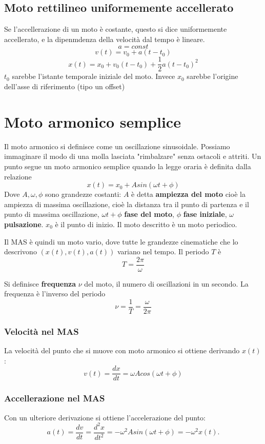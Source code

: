 \documentclass[a4paper]{report}
\begin{document}
  \subsection{Moto rettilineo uniformemente accellerato}
  Se l'accellerazione di un moto è costante, questo si dice uniformemente accellerato, e la dipenmdenza della velocità dal tempo è lineare.
  $$ a = const$$
  $$ v(t) = v_0 + a(t-t_0) $$
  $$ x(t) = x_0 + v_0(t-t_0) + \frac{1}{2} a(t-t_0)^2  $$
  $t_0$ sarebbe l'istante temporale iniziale del moto. Invece $x_0$ sarebbe l'origine dell'asse di riferimento (tipo un offset)

  \section{Moto armonico semplice}
  Il moto armonico si definisce come un oscillazione sinusoidale. Possiamo immaginare il modo di una molla lasciata "rimbalzare" senza ostacoli e attriti.
  Un punto segue un moto armonico semplice quando la legge oraria è definita dalla relazione
  $$ x(t) = x_0 + A sin(\omega t + \phi) $$
  Dove $A, \omega, \phi$ sono grandezze costanti: $A$ è detta \textbf{ampiezza del moto} cioè la ampiezza di massima oscillazione, cioè la distanza tra il punto di partenza e il punto di massima oscillazione, $\omega t + \phi$ \textbf{fase del moto}, $\phi$ \textbf{fase iniziale}, $\omega$ \textbf{pulsazione}.
  $x_0$ è il punto di inizio. Il moto descritto è un moto periodico.

  Il MAS è quindi un moto vario, dove tutte le grandezze cinematiche che lo descrivono $(x(t), v(t), a(t))$ variano nel tempo.
  Il periodo $T$ è
  $$ T = \frac{2\pi}{\omega} $$

  Si definisce \textbf{frequenza} $\nu$ del moto, il numero di oscillazioni in un secondo. La frequenza è l'inverso del periodo
  $$ \nu = \frac{1}{T}=\frac{\omega}{2\pi} $$
  \subsubsection{Velocità nel MAS}
  La velocità del punto che si muove con moto armonico si ottiene derivando $x(t)$:
  $$ v(t)=\frac{dx}{dt} = \omega A cos(\omega t + \phi) $$
  \subsubsection{Accellerazione nel MAS}
  Con un ulteriore derivazione si ottiene l'accelerazione del punto:
  $$ a(t)=\frac{dv}{dt}=\frac{d^2 x}{dt^2} = -\omega^2 A sin(\omega t + \phi) = -\omega^2 x(t). $$
\end{document}
